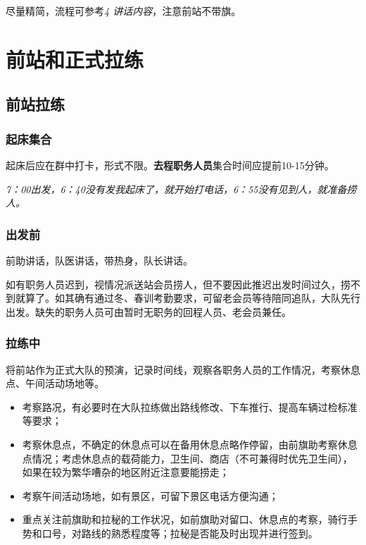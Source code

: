\documentclass[UTF8]{ctexart}
\begin{document}
尽量精简，流程可参考{\color{blue}\textit{4 讲话内容}}，注意前站不带旗。

\section{前站和正式拉练}

\subsection{前站拉练}

\subsubsection{起床集合}

起床后应在群中打卡，形式不限。\textbf{去程职务人员}集合时间应提前10-15分钟。

\textit{7：00出发，6：40没有发我起床了，就开始打电话，6：55没有见到人，就准备捞人。}

\subsubsection{出发前}

前助讲话，队医讲话，带热身，队长讲话。

如有职务人员迟到，视情况派送站会员捞人，但不要因此推迟出发时间过久，捞不到就算了。如其确有通过冬、春训考勤要求，可留老会员等待陪同追队，大队先行出发。缺失的职务人员可由暂时无职务的回程人员、老会员兼任。

\subsubsection{拉练中}

将前站作为正式大队的预演，记录时间线，观察各职务人员的工作情况，考察休息点、午间活动场地等。

\begin{itemize}[nosep,left=4em]
    \item 考察路况，有必要时在大队拉练做出路线修改、下车推行、提高车辆过检标准等要求；
    \item 考察休息点，不确定的休息点可以在备用休息点略作停留，由前旗助考察休息点情况；考虑休息点的载荷能力，卫生间、商店（不可兼得时优先卫生间），如果在较为繁华嘈杂的地区附近注意要能捞走；
    \item 考察午间活动场地，如有景区，可留下景区电话方便沟通；
    \item 重点关注前旗助和拉秘的工作状况，如前旗助对留口、休息点的考察，骑行手势和口号，对路线的熟悉程度等；拉秘是否能及时出现并进行签到。
\end{itemize}
\end{document}
